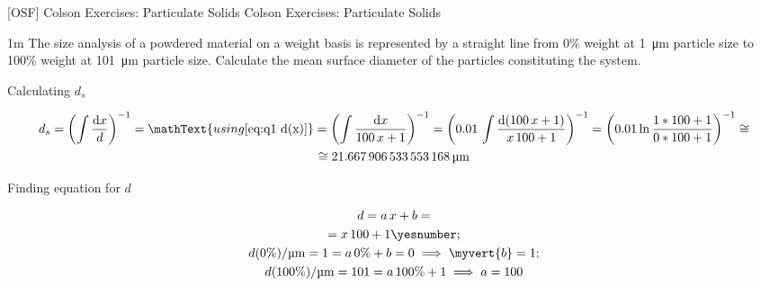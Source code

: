 \documentclass["./OSF-Exercises_Resolutions.tex"]{subfiles}
\begin{document}

[OSF]
{Colson Exercises: Particulate Solids} %
{Colson Exercises: Particulate Solids} %

\begin{questionBox}1m{} %
  The size analysis of a powdered material on a weight basis is represented by a straight line from 0\% weight at \qty{1}{\micro\metre} particle size to 100\% weight at \qty{101}{\micro\metre} particle size. Calculate the mean surface diameter of the particles constituting the system.

  \answer{}

  Calculating \(d_s\)
  \begin{tcolorbox}
    \begin{gather*}
      d_s 
      = \left(
        \int{
          \frac{\odif{x}}{d}
        }
      \right)^{-1}
      = \mathText{using \eqref{eq:q1 d(x)}}
      = \left(
        \int{
          \frac{\odif{x}}{
            100\,x+1
          }
        }
      \right)^{-1}
      = \left(
        0.01
        \,\int{
          \frac{\odif{(100\,x+1)}}{
            x\,100+1
          }
        }
      \right)^{-1}
      = \left(
        0.01
        \ln{\frac
          {1*100+1}
          {0*100+1}
        }
      \right)^{-1}
      \cong \\
      \cong \qty{21.667906533553168}{\micro\m}
    \end{gather*}
  \end{tcolorbox}

  Finding equation for \(d\)
  \begin{tcolorbox}
    \begin{gather*}
      d=a\,x+b
      = \\
      = x\,100+1
      \yesnumber\label{eq:q1 d(x)}
      ; \\
      d(0\%)/\unit{\micro\m} = 1
      = a\,0\%+b = 0
      \implies 
      \myvert{b} = 1
      ; \\
      d(100\%)/\unit{\micro\m} = 101
      = a\,100\%+1
      \implies a=100
    \end{gather*}
  \end{tcolorbox}

\end{questionBox}
\end{document}
